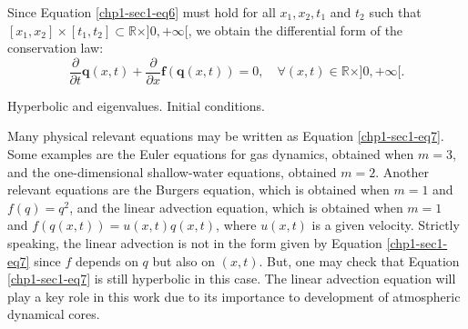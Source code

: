 Since Equation \eqref{chp1-sec1-eq6} must hold for all $x_1, x_2, t_1$ and $t_2$ such that
$[x_1, x_2] \times [t_1, t_2] \subset \mathbb{R}\times ]0, +\infty[$, we obtain the differential form of the conservation law:
\begin{equation}
	\label{chp1-sec1-eq7}
	\frac{\partial}{\partial t}\mathbf{q}(x, t) +
	\frac{\partial}{\partial x} \mathbf{f}(\mathbf{q}(x, t))
	= 0, \quad \forall (x,t) \in \mathbb{R}\times ]0, +\infty[. 
\end{equation}

Hyperbolic and eigenvalues. Initial conditions.

Many physical relevant equations may be written as Equation \eqref{chp1-sec1-eq7}.
Some examples are the Euler equations for gas dynamics, obtained when $m = 3$,
and the one-dimensional shallow-water equations, obtained $m = 2$.
Another relevant equations are the Burgers equation, which is obtained when
$m = 1$ and $f(q) = q^2$, and the linear advection equation, which is obtained
when $m = 1$ and $f(q(x,t)) = u(x,t)q(x,t)$, where $u(x,t)$ is a given velocity.
Strictly speaking, the linear advection is not in the form given by Equation
\eqref{chp1-sec1-eq7} since $f$ depends on $q$ but also on $(x,t)$.
But, one may check that Equation \eqref{chp1-sec1-eq7} is still hyperbolic
in this case. The linear advection equation will play a key role in this work due to its importance
to development of atmospheric dynamical cores.


